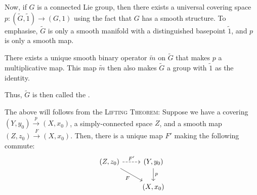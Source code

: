 \documentclass[12pt]{article}
\begin{document}
Now, if $G$ is a connected Lie group, 
then there exists a universal covering space $p \colon (\widetilde{G}, \widetilde{1}) \to (G, 1)$ 
using the fact that $G$ has a smooth structure. \newline
To emphasise, $\widetilde{G}$ is only a smooth manifold with a distinguished basepoint $\widetilde{1}$, 
and $p$ is only a smooth map.

\begin{thm}
	There exists a unique smooth binary operator $\widetilde{m}$ on $\widetilde{G}$ that makes $p$ a multiplicative map. 
	This map $\widetilde{m}$ then also makes $\widetilde{G}$ a group with $\widetilde{1}$ as the identity.

	Thus, $\widetilde{G}$ is then called the .
\end{thm}

The above will follows from the \textsc{Lifting Theorem}: Suppose we have a covering $(Y, y_{0}) \xrightarrow{p} (X, x_{0})$, a simply-connected space $Z$, and a smooth map $(Z, z_{0}) \xrightarrow{F} (X, x_{0})$. Then, there is a unique map $F'$ making the following commute:
\begin{equation*} 
	\begin{tikzcd}
		{(Z, z_{0})} \arrow[rd, "F"'] \arrow[r, "F'", dashed] & {(Y, y_{0})} \arrow[d, "p"] \\
		& {(X, x_{0})}
	\end{tikzcd}
\end{equation*}
\end{document}
